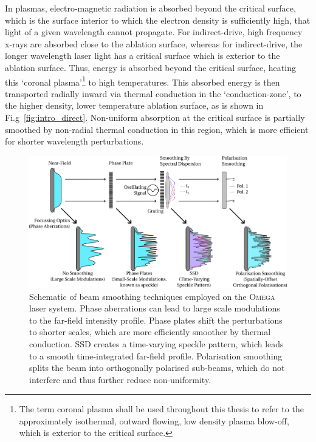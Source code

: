 In plasmas, electro-magnetic radiation is absorbed beyond the critical surface, which is the surface interior to which the electron density is sufficiently high, that light of a given wavelength cannot propagate.
For indirect-drive, high frequency x-rays are absorbed close to the ablation surface, whereas for indirect-drive, the longer wavelength laser light has a critical surface which is exterior to the ablation surface.
Thus, energy is absorbed beyond the critical surface, heating this `coronal plasma'\footnote{The term coronal plasma shall be used throughout this thesis to refer to the approximately isothermal, outward flowing, low density plasma blow-off, which is exterior to the critical surface.} to high temperatures.
This absorbed energy is then transported radially inward via thermal conduction in the `conduction-zone', to the higher density, lower temperature ablation surface, as is shown in Fi.g~\ref{fig:intro_direct}.
Non-uniform absorption at the critical surface is partially smoothed by non-radial thermal conduction in this region, which is more efficient for shorter wavelength perturbations.


\begin{figure}[t!]
    \includegraphics[width=\linewidth]{Introduction/Images/SmoothingOptics.png}
    \centering
    \caption{Schematic of beam smoothing techniques employed on the \textsc{Omega} laser system.
    Phase aberrations can lead to large scale modulations to the far-field intensity profile.
    Phase plates shift the perturbations to shorter scales, which are more efficiently smoother by thermal conduction.
    \ac{SSD} creates a time-varying speckle pattern, which leads to a smooth time-integrated far-field profile.
    Polarisation smoothing splits the beam into orthogonally polarised sub-beams, which do not interfere and thus further reduce non-uniformity.
    }%
    \label{fig:intro_SmoothingOptics}
\end{figure}

